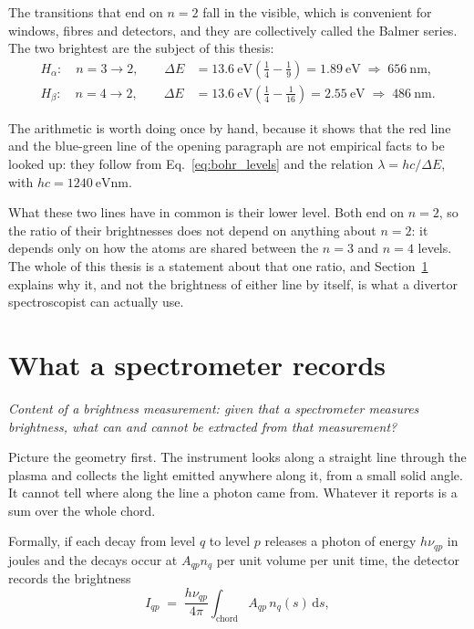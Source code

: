 The transitions that end on $n = 2$ fall in the visible, which is convenient for
windows, fibres and detectors, and they are collectively called the Balmer
series. The two brightest are the subject of this thesis:
\begin{align}
  H_\alpha:\quad n=3 \to 2, \qquad
  \Delta E &= \SI{13.6}{\electronvolt}\left(\tfrac{1}{4}-\tfrac{1}{9}\right)
            = \SI{1.89}{\electronvolt} \;\Rightarrow\; \SI{656}{\nano\metre},
  \label{eq:halpha}\\
  H_\beta:\quad n=4 \to 2, \qquad
  \Delta E &= \SI{13.6}{\electronvolt}\left(\tfrac{1}{4}-\tfrac{1}{16}\right)
            = \SI{2.55}{\electronvolt} \;\Rightarrow\; \SI{486}{\nano\metre}.
  \label{eq:hbeta}
\end{align}

\noindent The arithmetic is worth doing once by hand, because it shows that the
red line and the blue-green line of the opening paragraph are not empirical
facts to be looked up: they follow from Eq.~\eqref{eq:bohr_levels} and the
relation $\lambda = hc/\Delta E$, with $hc = \SI{1240}{\electronvolt\nano\metre}$.

What these two lines have in common is their lower level. Both end on $n = 2$,
so the ratio of their brightnesses does not depend on anything about $n = 2$: it
depends only on how the atoms are shared between the $n = 3$ and $n = 4$ levels.
The whole of this thesis is a statement about that one ratio, and
Section~\ref{sec:spectrometer} explains why it, and not the brightness of either
line by itself, is what a divertor spectroscopist can actually use.

\section{What a spectrometer records}
\label{sec:spectrometer}

\emph{Content of a brightness measurement: given that a spectrometer measures brightness, what can and
cannot be extracted from that measurement?}

Picture the geometry first. The instrument looks along a straight line through
the plasma and collects the light emitted anywhere along it, from a small solid
angle. It cannot tell where along the line a photon came from. Whatever it
reports is a sum over the whole chord.

Formally, if each decay from level $q$ to level $p$ releases a photon of energy
$h\nu_{qp}$ in joules and the decays occur at $A_{qp}n_q$ per unit volume per
unit time, the detector records the brightness
\begin{equation}
  I_{qp} \;=\; \frac{h\nu_{qp}}{4\pi}\int_{\text{chord}} A_{qp}\,n_q(s)\,\mathrm{d}s ,
  \label{eq:brightness}
\end{equation}

